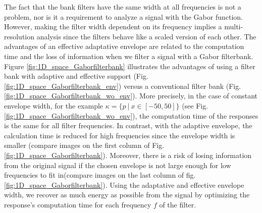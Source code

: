 \documentclass[journal]{IEEEtran}
\begin{document}
The fact that the bank filters have the same width at all frequencies is not a problem, nor is it a requirement to analyze a signal with the Gabor function. However, making the filter width dependent on its frequency implies a multi-resolution analysis since the filters behave like a scaled version of each other. The advantages of an effective adaptative envelope are related to the computation time and the loss of information when we filter a signal with a Gabor filterbank. Figure \ref{fig:1D_space_Gaborfilterbank} illustrates the advantages of using a filter bank with adaptive and effective support (Fig. \ref{fig:1D_space_Gaborfilterbank_env}) versus a conventional filter bank (Fig. \ref{fig:1D_space_Gaborfilterbank_wo_env}). More precisely, in the case of constant envelope width, for the example $\kappa = \lbrace p ~|~ x \in [-50, 50] \rbrace$ (see Fig. \ref{fig:1D_space_Gaborfilterbank_wo_env}), the computation time of the responses is the same for all filter frequencies. In contrast, with the adaptive envelope, the calculation time is reduced for high frequencies since the envelope width is smaller (compare images on the first column of Fig. \ref{fig:1D_space_Gaborfilterbank}). Moreover, there is a risk of losing information from the original signal if the chosen envelope is not large enough for low frequencies to fit in(compare images on the last column of fig. \ref{fig:1D_space_Gaborfilterbank}). Using the adaptative and effective envelope width, we recover as much energy as possible from the signal by optimizing the response's computation time for each frequency $f$ of the filter.
\end{document}
